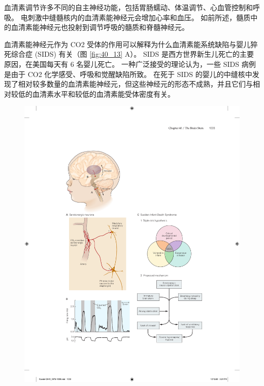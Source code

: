 血清素调节许多不同的自主神经功能，包括胃肠蠕动、体温调节、心血管控制和呼吸。 电刺激中缝髓核内的血清素能神经元会增加心率和血压。 如前所述，髓质中的血清素能神经元也投射到调节呼吸的髓质和脊髓神经元。

血清素能神经元作为 CO2 受体的作用可以解释为什么血清素能系统缺陷与婴儿猝死综合症 (SIDS) 有关（图 \ref{fig:40_13} A）。 
SIDS 是西方世界新生儿死亡的主要原因，在美国每天有 6 名婴儿死亡。 一种广泛接受的理论认为，一些 SIDS 病例是由于 CO2 化学感受、呼吸和觉醒缺陷所致。 在死于 SIDS 的婴儿的中缝核中发现了相对较多数量的血清素能神经元，但这些神经元的形态不成熟，并且它们与相对较低的血清素水平和较低的血清素能受体密度有关。

\begin{figure}[htbp]
	\centering
	\includegraphics[width=0.8\linewidth]{chap40/fig_40_13}

\end{figure}
